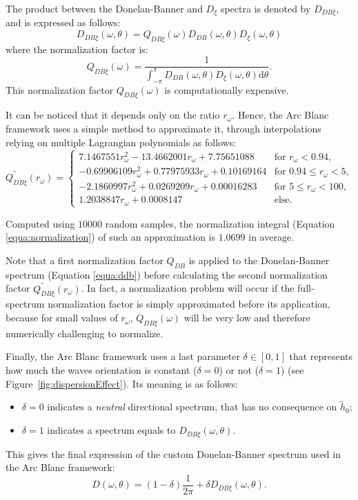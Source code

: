 \documentclass[final]{jcgt}
\def\framework{the Arc Blanc framework\xspace}
\begin{document}
The product between the Donelan-Banner and $D_{\xi}$ spectra is denoted by $D_{DB\xi}$, and is expressed as follows:
\begin{equation}
	D_{DB\xi}(\omega, \theta) =Q_{DB\xi}(\omega) D_{DB}(\omega, \theta) D_{\xi}(\omega, \theta)
\end{equation}
where the normalization factor is:
\begin{equation}
	Q_{DB\xi}(\omega)=\frac{1}{\displaystyle\int_{-\pi}^\pi D_{DB}(\omega, \theta) D_{\xi}(\omega, \theta) \mathrm{d} \theta}.
\end{equation}
This normalization factor $Q_{DB\xi}(\omega)$ is computationally expensive.

It can be noticed that it depends only on the ratio $r_{\omega}$.
Hence, \framework uses a simple method to approximate it, through interpolations relying on multiple Lagrangian polynomials as follows:
\begin{equation}
	\widetilde{Q_{DB\xi}}(r_{\omega})=
	\begin{cases}
		7.1467551 r_{\omega}^2 - 13.4662001 r_{\omega} + 7.75651088    & \text{for }r_{\omega} < 0.94,        \\
		- 0.69906109 r_{\omega}^2 + 0.77975933 r_{\omega} + 0.10169164 & \text{for }0.94 \leq r_{\omega} < 5, \\
		- 2.1860997 r_{\omega}^2 +0.0269209 r_{\omega} +0.00016283     & \text{for } 5 \leq r_{\omega} < 100, \\
		1.2038847 r_{\omega} + 0.0008147                               & \text{else.}
	\end{cases}
\end{equation}

Computed using $10000$ random samples, the normalization integral (Equation \ref{equa:normalization}) of such an approximation is $1.0699$ in average.

Note that a first normalization factor $Q_{DB}$ is applied to the Donelan-Banner spectrum (Equation \ref{equa:ddb}) before calculating the second normalization factor $\widetilde{Q_{DB\xi}}(r_{\omega})$. In fact, a normalization problem will occur if the full-spectrum normalization factor is simply approximated before its application, because for small values of $r_{\omega}$, $Q_{DB\xi}(\omega)$ will be very low and therefore numerically challenging to normalize.

Finally, \framework uses a last parameter $\delta\in[0,1]$ that represents how much the waves orientation is constant ($\delta = 0$) or not ($\delta = 1$) (see Figure~\ref{fig:dispersionEffect}).
Its meaning is as follows:
\begin{itemize}
	\item $\delta = 0$ indicates a \emph{neutral} directional spectrum, that has no consequence on $\tilde{h}_0$;
	\item $\delta=1$ indicates a spectrum equals to $D_{DB\xi}(\omega, \theta)$.
\end{itemize}
This gives the final expression of the custom Donelan-Banner spectrum used in \framework:
\begin{equation}
	D(\omega, \theta)=\left(1-\delta\right)\frac{1}{2\pi}+\delta D_{DB\xi}(\omega,\theta).
\end{equation}
\end{document}
